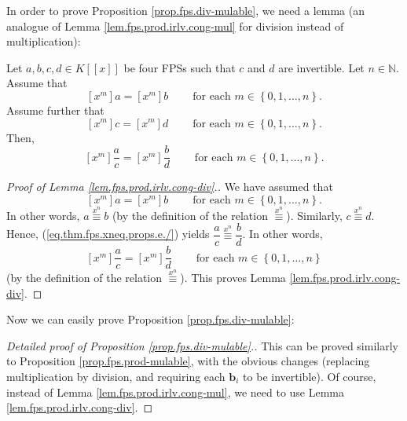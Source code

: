 \begin{fineprint}
In order to prove Proposition \ref{prop.fps.div-mulable}, we need a lemma (an
analogue of Lemma \ref{lem.fps.prod.irlv.cong-mul} for division instead of multiplication):

\begin{lemma}
\label{lem.fps.prod.irlv.cong-div}Let $a,b,c,d\in K\left[  \left[  x\right]
\right]  $ be four FPSs such that $c$ and $d$ are invertible. Let
$n\in\mathbb{N}$. Assume that
\[
\left[  x^{m}\right]  a=\left[  x^{m}\right]  b\ \ \ \ \ \ \ \ \ \ \text{for
each }m\in\left\{  0,1,\ldots,n\right\}  .
\]
Assume further that%
\[
\left[  x^{m}\right]  c=\left[  x^{m}\right]  d\ \ \ \ \ \ \ \ \ \ \text{for
each }m\in\left\{  0,1,\ldots,n\right\}  .
\]
Then,
\[
\left[  x^{m}\right]  \dfrac{a}{c}=\left[  x^{m}\right]  \dfrac{b}%
{d}\ \ \ \ \ \ \ \ \ \ \text{for each }m\in\left\{  0,1,\ldots,n\right\}  .
\]

\end{lemma}

\begin{proof}
[Proof of Lemma \ref{lem.fps.prod.irlv.cong-div}.]We have assumed that
\[
\left[  x^{m}\right]  a=\left[  x^{m}\right]  b\ \ \ \ \ \ \ \ \ \ \text{for
each }m\in\left\{  0,1,\ldots,n\right\}  .
\]
In other words, $a\overset{x^{n}}{\equiv}b$ (by the definition of the relation
$\overset{x^{n}}{\equiv}$). Similarly, $c\overset{x^{n}}{\equiv}d$. Hence,
(\ref{eq.thm.fps.xneq.props.e./}) yields $\dfrac{a}{c}\overset{x^{n}}{\equiv
}\dfrac{b}{d}$. In other words,%
\[
\left[  x^{m}\right]  \dfrac{a}{c}=\left[  x^{m}\right]  \dfrac{b}%
{d}\ \ \ \ \ \ \ \ \ \ \text{for each }m\in\left\{  0,1,\ldots,n\right\}
\]
(by the definition of the relation $\overset{x^{n}}{\equiv}$). This proves
Lemma \ref{lem.fps.prod.irlv.cong-div}.
\end{proof}

Now we can easily prove Proposition \ref{prop.fps.div-mulable}:

\begin{proof}
[Detailed proof of Proposition \ref{prop.fps.div-mulable}.]This can be proved
similarly to Proposition \ref{prop.fps.prod-mulable}, with the obvious changes
(replacing multiplication by division, and requiring each $\mathbf{b}_{i}$ to
be invertible). Of course, instead of Lemma \ref{lem.fps.prod.irlv.cong-mul},
we need to use Lemma \ref{lem.fps.prod.irlv.cong-div}.
\end{proof}
\end{fineprint}

